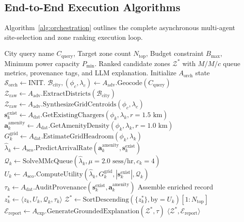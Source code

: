 \documentclass[preprint,12pt,authoryear]{elsarticle}
\begin{document}
\subsection{End-to-End Execution Algorithms}
Algorithm~\ref{alg:orchestration} outlines the complete asynchronous multi-agent site-selection and zone ranking execution loop.

\begin{algorithm}[t]
\caption{End-to-End Multi-Agent Spatial Siting and Zone Ranking Pipeline}
\label{alg:orchestration}
\begin{algorithmic}[1]
\REQUIRE City query name $C_{\text{query}}$, Target zone count $N_{\text{top}}$, Budget constraint $B_{\max}$, Minimum power capacity $P_{\min}$.
\ENSURE Ranked candidate zones $\mathcal{Z}^*$ with $M/M/c$ queue metrics, provenance tags, and LLM explanation.
\STATE Initialize $A_{\text{orch}}$ state $\mathcal{S}_{\text{orch}} \leftarrow \text{INIT}$.
\STATE {}
\STATE $\mathcal{B}_{\text{city}}, (\phi_c, \lambda_c) \leftarrow A_{\text{adv}}.\text{Geocode}(C_{\text{query}})$
\STATE $\mathcal{Z}_{\text{raw}} \leftarrow A_{\text{adv}}.\text{ExtractDistricts}(\mathcal{B}_{\text{city}})$
    \STATE $\mathcal{Z}_{\text{raw}} \leftarrow A_{\text{adv}}.\text{SynthesizeGridCentroids}(\phi_c, \lambda_c)$
\ENDIF
\STATE {}
    \STATE $\mathbf{s}_k^{\text{exist}} \leftarrow A_{\text{dat}}.\text{GetExistingChargers}(\phi_k, \lambda_k, r=1.5\text{ km})$
    \STATE $\mathbf{a}_k^{\text{amenity}} \leftarrow A_{\text{dat}}.\text{GetAmenityDensity}(\phi_k, \lambda_k, r=1.0\text{ km})$
    \STATE $G_k^{\text{grid}} \leftarrow A_{\text{dat}}.\text{EstimateGridHeadroom}(\phi_k, \lambda_k)$
    \STATE $\hat{\lambda}_k \leftarrow A_{\text{sco}}.\text{PredictArrivalRate}(\mathbf{a}_k^{\text{amenity}}, \mathbf{s}_k^{\text{exist}})$
    \STATE {}
    \STATE $\mathcal{Q}_k \leftarrow \text{SolveMMcQueue}(\hat{\lambda}_k, \mu=2.0\text{ sess/hr}, c_k=4)$
    \STATE $U_k \leftarrow A_{\text{sco}}.\text{ComputeUtility}(\hat{\lambda}_k, G_k^{\text{grid}}, |\mathbf{s}_k^{\text{exist}}|, \mathcal{Q}_k)$
    \STATE $\tau_k \leftarrow A_{\text{dat}}.\text{AuditProvenance}(\mathbf{s}_k^{\text{exist}}, \mathbf{a}_k^{\text{amenity}})$
    \STATE Assemble enriched record $z_k^* \leftarrow \langle z_k, U_k, \mathcal{Q}_k, \tau_k \rangle$
\ENDFOR
\STATE {}
\STATE $\mathcal{Z}^* \leftarrow \text{SortDescending}(\{z_k^*\}, \text{by}=U_k)[1:N_{\text{top}}]$
\STATE $\mathcal{E}_{\text{report}} \leftarrow A_{\text{exp}}.\text{GenerateGroundedExplanation}(\mathcal{Z}^*, \tau)$
\RETURN $\langle \mathcal{Z}^*, \mathcal{E}_{\text{report}} \rangle$
\end{algorithmic}
\end{algorithm}
\end{document}
